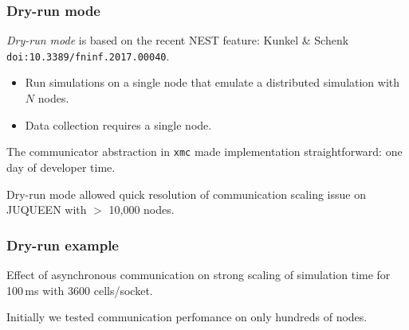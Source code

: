 \documentclass[aspectratio=43,12pt]{beamer}
\newcommand{\xmc}{\texttt{xmc}\xspace}
\begin{document}
\begin{frame}
\frametitle{Dry-run mode}
\vfill
\emph{Dry-run mode} is based on the recent NEST feature: Kunkel \& Schenk \texttt{doi:10.3389/fninf.2017.00040}.

\begin{itemize}
    \item Run simulations on a single node that emulate a distributed simulation with $N$ nodes.
    \item Data collection requires a single node.
\end{itemize}

\vfill
The communicator abstraction in \xmc{} made implementation straightforward: one day of developer time.

\vfill
Dry-run mode allowed quick resolution of communication scaling issue on JUQUEEN with $>$ 10,000 nodes.
\vfill
\end{frame}

\begin{frame}
\frametitle{Dry-run example}

\vfill
\begin{center}
    {\small Effect of asynchronous communication on strong scaling of simulation time for 100\,ms with 3600 cells/socket.}
\end{center}


\vfill
Initially we tested communication perfomance on only hundreds of nodes.
\vfill
\end{frame}
\end{document}

